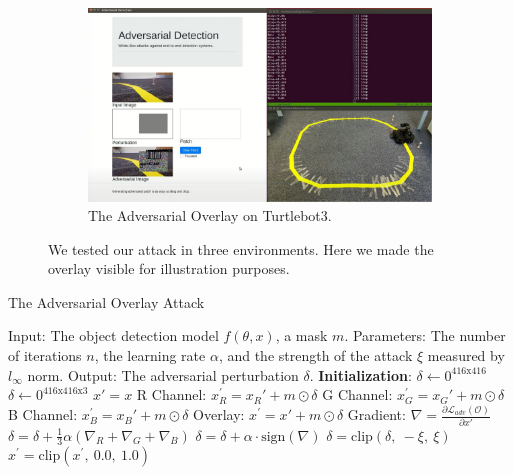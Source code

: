 \begin{figure}[b]
\hfill
\begin{subfigure}[b]{0.31\textwidth}
    \centering
    \includegraphics[width=\textwidth]{figures/chapter_detection/detection/turtlebot.jpg}
    \caption{The Adversarial Overlay on Turtlebot3.}
    \label{fig:turtlebot}
\end{subfigure}
\caption{We tested our attack in three environments. Here we made the overlay visible for illustration purposes.}
\label{fig.adv_detect_demo}
\end{figure}

\begin{algorithm}[t]
    \caption{The Adversarial Overlay Attack}\label{alg:adv-overlay}
    \begin{algorithmic}
        \State Input: The object detection model $f(\theta, x)$, a mask $m$.
        \State Parameters: The number of iterations $n$, the learning rate $\alpha$, and the strength of the attack $\xi$ measured by $l_{\infty}$ norm.
        \State Output: The adversarial perturbation $\delta$.
        \State \textbf{Initialization}: 
            \State $\delta \leftarrow 0^{416\text{x}416}$
        \Else
            \State $\delta \leftarrow 0^{416\text{x}416\text{x}3}$
        \EndIf
            \State $x' = x$
                \State R Channel: $x_R^{'} = x_R' + m \odot \delta$
                \State G Channel: $x_G^{'} = x_G' + m \odot \delta$
                \State B Channel: $x_B^{'} = x_B' + m \odot \delta$
                \Else
                    \State Overlay: $x^{'} = x' + m \odot \delta$
                \EndIf
                \State Gradient: $\nabla = \frac{\partial \mathcal{L}_{adv}(\mathcal{O})}{\partial x'}$
                    \State $\delta = \delta +  \frac{1}{3}\alpha(\nabla_R + \nabla_G + \nabla_B) $
                \Else
                    \State $\delta = \delta + \alpha \cdot \text{sign}(\nabla)$
                \EndIf
                \State $\delta = \text{clip}(\delta,\ -\xi,\ \xi)$
                \State $x^{'} = \text{clip}(x^{'},\ 0.0,\ 1.0)$
            \EndFor
        \EndFor
    \end{algorithmic}
\end{algorithm}


